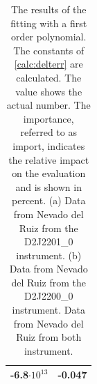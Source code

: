 \documentclass  [
  paper    = a4,
  BCOR     = 10mm,
  twoside,
  fontsize = 12pt,
  fleqn,
  toc      = bibnumbered,
  toc      = listofnumbered,
  numbers  = noendperiod,
  headings = normal,
  listof   = leveldown,
  version  = 3.03
]                                       {scrreprt}
\begin{document}
\begin{table}
{\begin{tabular}{cc}
			 -6.8$\cdot10^{13}$& -0.047\\
			\bottomrule
	\end{tabular}}
	\label{tab:coefNevad}
	\caption{
		The results of the fitting with a first order polynomial. 
		The constants of \cref{calc:delterr} are calculated.
		The value shows the actual number. The importance,  referred to as import, indicates the relative impact on the evaluation and is shown in percent.
		(a) Data from Nevado del Ruiz from the D2J2201\_0 instrument. 
			(b) Data from Nevado del Ruiz from the D2J2200\_0 instrument.  %
			Data from Nevado del Ruiz from both instrument. 
		}	
	\end{table}	
\end{document}
